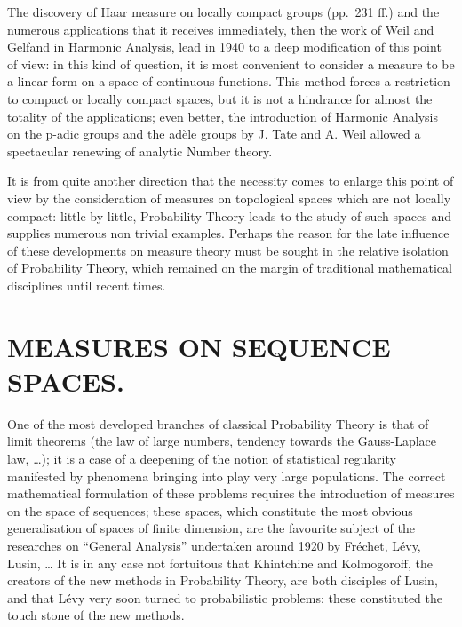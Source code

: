 The discovery of Haar measure on locally compact groups (pp.~231 ff.) and the numerous applications that it receives immediately, then the work of Weil and Gelfand in Harmonic Analysis, lead in 1940 to a deep modification of this point of view: in this kind of question, it is most convenient to consider a measure to be a linear form on a space of continuous functions. This method forces a restriction to compact or locally compact spaces, but it is not a hindrance for almost the totality of the applications; even better, the introduction of Harmonic Analysis on the p-adic groups and the adèle groups by J. Tate and A. Weil allowed a spectacular renewing of analytic Number theory.

It is from quite another direction that the necessity comes to enlarge this point of view by the consideration of measures on topological spaces which are not locally compact: little by little, Probability Theory leads to the study of such spaces and supplies numerous non trivial examples. Perhaps the reason for the late influence of these developments on measure theory must be sought in the relative isolation of Probability Theory, which remained on the margin of traditional mathematical disciplines until recent times.

\section*{MEASURES ON SEQUENCE SPACES.}
{}

One of the most developed branches of classical Probability Theory is that of limit theorems (the law of large numbers, tendency towards the Gauss-Laplace law, \ldots); it is a case of a deepening of the notion of statistical regularity manifested by phenomena bringing into play very large populations. The correct mathematical formulation of these problems requires the introduction of measures on the space of sequences; these spaces, which constitute the most obvious generalisation of spaces of finite dimension, are the favourite subject of the researches on ``General Analysis'' undertaken around 1920 by Fréchet, Lévy, Lusin, \ldots{} It is in any case not fortuitous that Khintchine and Kolmogoroff, the creators of the new methods in Probability Theory, are both disciples of Lusin, and that Lévy very soon turned to probabilistic problems: these constituted the touch stone of the new methods.

